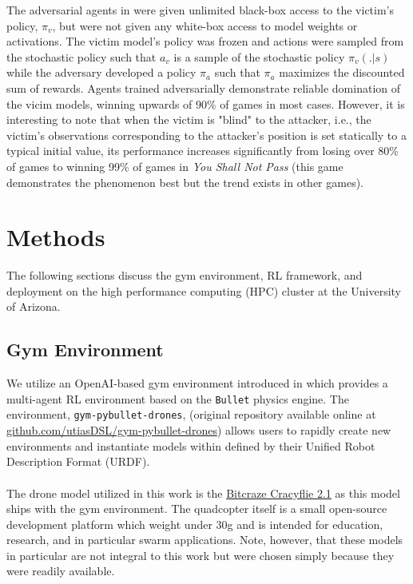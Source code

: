 \documentclass{article}
\begin{document}
\noindent 
The adversarial agents in \cite{Gleave2019} were given unlimited black-box access to the victim's policy, $\pi_v$, but were not given any white-box access to model weights or activations. 
The victim model's policy was frozen and actions were sampled from the stochastic policy such that $a_v$ is a sample of the stochastic policy $\pi_v(. | s)$ while the adversary developed a policy $\pi_a$ such that $\pi_a$ maximizes the discounted sum of rewards. 
Agents trained adversarially demonstrate reliable domination of the vicim models, winning upwards of 90\% of games in most cases. 
However, it is interesting to note that when the victim is "blind" to the attacker, i.e., the victim's observations corresponding to the attacker's position is set statically to a typical initial value, its performance increases significantly from losing over 80\% of games to winning 99\% of games in \textit{You Shall Not Pass} (this game demonstrates the phenomenon best but the trend exists in other games). 

\section{Methods}\label{sec:methods}
The following sections discuss the gym environment, RL framework, and deployment on the high performance computing (HPC) cluster at the University of Arizona.

\subsection{Gym Environment}\label{subsec:gym_env}
We utilize an OpenAI-based gym environment introduced in \cite{Panerati2021} which provides a multi-agent RL environment based on the \texttt{Bullet} physics engine. 
The environment, \texttt{gym-pybullet-drones}, (original repository available online at \url{github.com/utiasDSL/gym-pybullet-drones}) allows users to rapidly create new environments and instantiate models within defined by their Unified Robot Description Format (URDF). \\ \\
\noindent
The drone model utilized in this work is the \href{https://www.bitcraze.io/documentation/hardware/crazyflie_2_1/crazyflie_2_1-datasheet.pdf}{Bitcraze Cracyflie 2.1} as this model ships with the gym environment. 
The quadcopter itself is a small open-source development platform which weight under 30g and is intended for education, research, and in particular swarm applications. 
Note, however, that these models in particular are not integral to this work but were chosen simply because they were readily available.
\end{document}
